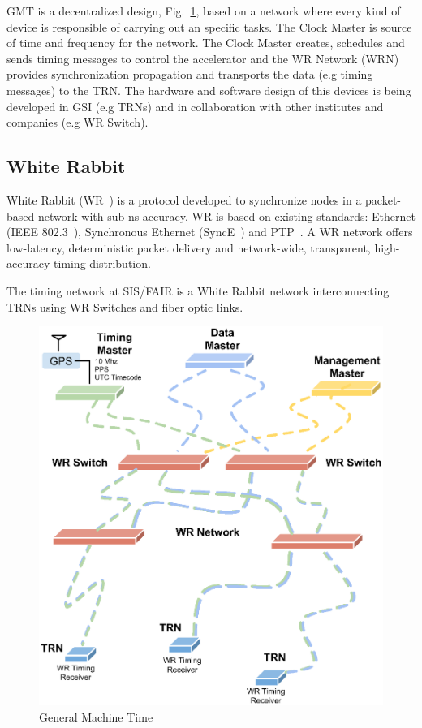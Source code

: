 \documentclass{JAC2003}
\begin{document}
GMT is a decentralized design, Fig.~\ref{network}, based on a network where every kind of device
is responsible of carrying out an specific tasks. The Clock Master is source of time and frequency for the network.
The Clock Master creates, schedules and sends timing messages to control the accelerator
and the WR Network (WRN) provides synchronization propagation and transports the data (e.g timing messages) to the TRN. 
The hardware and software design of this devices is being developed in GSI (e.g TRNs) and in
collaboration with other institutes and companies (e.g WR Switch). 

\subsection{White Rabbit}

White Rabbit (WR~\cite{wr}) is a protocol developed to
synchronize nodes in a packet-based network with sub-ns accuracy. WR is based 
on existing standards: Ethernet (IEEE 802.3~\cite{internet}),
Synchronous Ethernet (SyncE~\cite{sync}) and PTP~\cite{ptp}. 
A WR network offers low-latency, deterministic packet delivery and network-wide, 
transparent, high-accuracy timing distribution. 

The timing network at SIS/FAIR is a White Rabbit network interconnecting TRNs 
using WR Switches and fiber optic links.

\begin{figure}[htb]
   \centering
   \includegraphics*[scale=0.5]{THPPC092f1.eps}
   \caption{General Machine Time}
   \label{network}
\end{figure}
\end{document}

